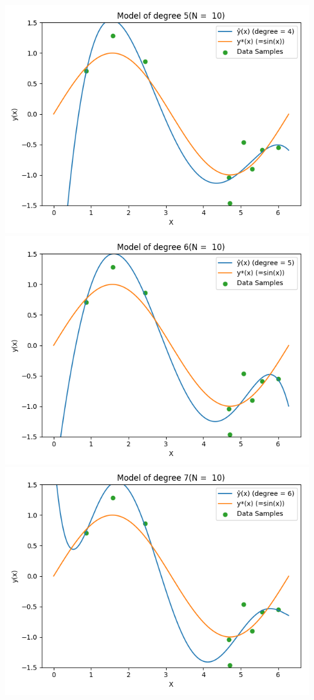 \documentclass{article}
\begin{document}
\includegraphics[width=\linewidth]{5.png}
\includegraphics[width=\linewidth]{6.png}
\includegraphics[width=\linewidth]{7.png}
\end{document}
